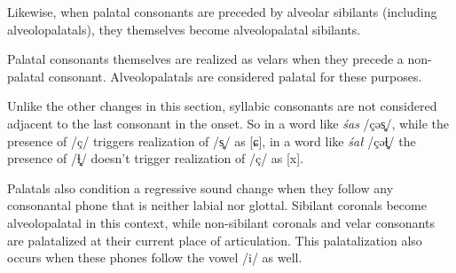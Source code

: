 \documentclass[a4paper,11pt,oneside,openany]{memoir}
\newcommand{\bripa}[1]{[#1]}
\newcommand{\phipa}[1]{/#1/}
\newcommand{\latfric}{ɬ}
\newcommand{\alvpalesh}{ɕ}
\newcommand{\schwa}{ə}
\newcommand{\lamino}{̻}
\begin{document}
Likewise, when palatal consonants are preceded by alveolar sibilants (including alveolopalatals), they themselves become alveolopalatal sibilants.

\begin{center}
\end{center}

Palatal consonants themselves are realized as velars when they precede a non-palatal consonant. Alveolopalatals are considered palatal for these purposes. 

\begin{center}
\end{center}
\noindent Unlike the other changes in this section, syllabic consonants are not considered adjacent to the last consonant in the onset. So in a word like \textit{\'sas} \phipa{ç\schwa s\lamino}, while the presence of \phipa{ç} triggers realization of \phipa{s\lamino} as \bripa{\alvpalesh}, in a word like \textit{\'sa\l} \phipa{ç\schwa\latfric\lamino} the presence of \phipa{\latfric\lamino} doesn't trigger realization of \phipa{ç} as \bripa{x}.

Palatals also condition a regressive sound change when they follow any consonantal phone that is neither labial nor glottal. Sibilant coronals become alveolopalatal in this context, while non-sibilant coronals and velar consonants are palatalized at their current place of articulation. This palatalization also occurs when these phones follow the vowel \phipa{i} as well.
\end{document}
